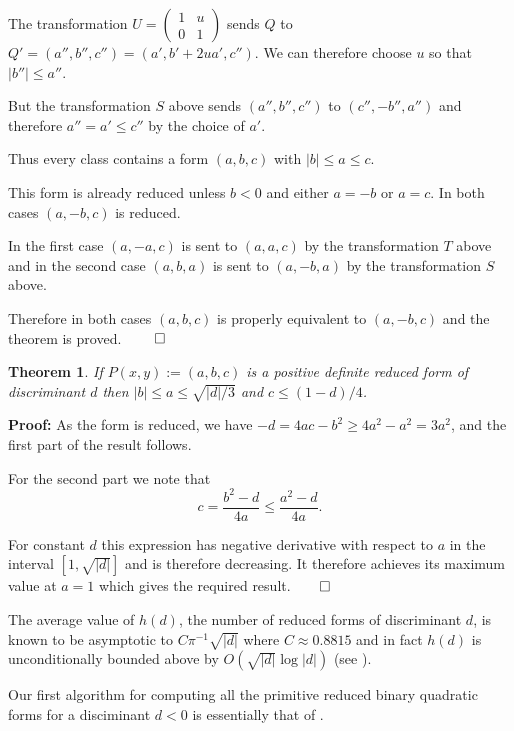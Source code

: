 \documentclass[a4paper,10pt]{amsart}
\newtheorem{theorem}{Theorem}[section]
\begin{document}
The transformation $U = \left(\begin{array}{cc}1 & u \\ 0 & 1 \end{array}\right)$ sends $Q$ to $Q' = (a'', b'', c'') = (a', b' + 2ua', c'')$. We can therefore choose $u$ so that $|b''| \leq a''$. 

But the transformation $S$ above sends $(a'', b'', c'')$ to $(c'', -b'', a'')$ and therefore $a'' = a' \leq c''$ by the choice of $a'$. 

Thus every class contains a form $(a, b, c)$ with $|b| \leq a \leq c$.

This form is already reduced unless $b < 0$ and either $a = -b$ or $a = c$. In both cases $(a, -b, c)$ is reduced. 

In the first case $(a, -a, c)$ is sent to $(a, a, c)$ by the transformation $T$ above and in the second case $(a, b, a)$ is sent to $(a, -b, a)$ by the transformation $S$ above. 

Therefore in both cases $(a, b, c)$ is properly equivalent to $(a, -b, c)$ and the theorem is proved. $\qed$

\begin{theorem}\label{ineq}
If $P(x, y) := (a, b, c)$ is a positive definite reduced form of discriminant $d$ then $|b| \leq a \leq \sqrt{|d|/3}$ and $c \leq (1-d)/4$. 
\end{theorem}

\textbf{Proof:}
As the form is reduced, we have $-d = 4ac - b^2 \geq 4a^2 - a^2 = 3a^2$, and the first part of the result follows. 

For the second part we note that
$$c = \frac{b^2 - d}{4a} \leq \frac{a^2 - d}{4a}.$$

For constant $d$ this expression has negative derivative with respect to $a$ in the interval $[1, \sqrt{|d|}]$ and is therefore decreasing. It therefore achieves its maximum value at $a = 1$ which gives the required result.$\qed$

The average value of $h(d)$, the number of reduced forms of discriminant $d$, is known to be asymptotic to $C\pi^{-1}\sqrt{|d|}$ where $C \approx 0.8815$ and in fact $h(d)$ is unconditionally bounded above by $O(\sqrt{|d|}\log{|d|})$ (see \cite{cohen}).

Our first algorithm for computing all the primitive reduced binary quadratic forms for a disciminant $d < 0$ is essentially that of \cite{buchmann}. 
\end{document}
